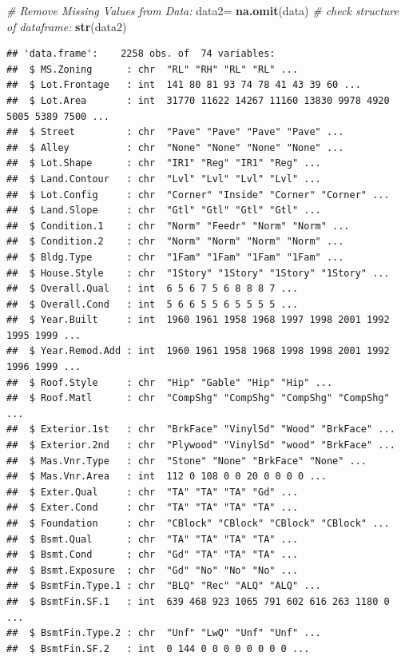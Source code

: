 \documentclass[
]{article}
\newenvironment{Shaded}{\begin{snugshade}}{\end{snugshade}}
\newcommand{\CommentTok}[1]{\textcolor[rgb]{0.56,0.35,0.01}{\textit{#1}}}
\newcommand{\KeywordTok}[1]{\textcolor[rgb]{0.13,0.29,0.53}{\textbf{#1}}}
\newcommand{\NormalTok}[1]{#1}
\newcommand{\StringTok}[1]{\textcolor[rgb]{0.31,0.60,0.02}{#1}}
\begin{document}
\begin{Shaded}
\begin{Highlighting}[]
\CommentTok{# Remove Missing Values from Data:}
\NormalTok{data2=}\StringTok{ }\KeywordTok{na.omit}\NormalTok{(data)}
\CommentTok{# check structure of dataframe:}
\KeywordTok{str}\NormalTok{(data2)}
\end{Highlighting}
\end{Shaded}

\begin{verbatim}
## 'data.frame':    2258 obs. of  74 variables:
##  $ MS.Zoning      : chr  "RL" "RH" "RL" "RL" ...
##  $ Lot.Frontage   : int  141 80 81 93 74 78 41 43 39 60 ...
##  $ Lot.Area       : int  31770 11622 14267 11160 13830 9978 4920 5005 5389 7500 ...
##  $ Street         : chr  "Pave" "Pave" "Pave" "Pave" ...
##  $ Alley          : chr  "None" "None" "None" "None" ...
##  $ Lot.Shape      : chr  "IR1" "Reg" "IR1" "Reg" ...
##  $ Land.Contour   : chr  "Lvl" "Lvl" "Lvl" "Lvl" ...
##  $ Lot.Config     : chr  "Corner" "Inside" "Corner" "Corner" ...
##  $ Land.Slope     : chr  "Gtl" "Gtl" "Gtl" "Gtl" ...
##  $ Condition.1    : chr  "Norm" "Feedr" "Norm" "Norm" ...
##  $ Condition.2    : chr  "Norm" "Norm" "Norm" "Norm" ...
##  $ Bldg.Type      : chr  "1Fam" "1Fam" "1Fam" "1Fam" ...
##  $ House.Style    : chr  "1Story" "1Story" "1Story" "1Story" ...
##  $ Overall.Qual   : int  6 5 6 7 5 6 8 8 8 7 ...
##  $ Overall.Cond   : int  5 6 6 5 5 6 5 5 5 5 ...
##  $ Year.Built     : int  1960 1961 1958 1968 1997 1998 2001 1992 1995 1999 ...
##  $ Year.Remod.Add : int  1960 1961 1958 1968 1998 1998 2001 1992 1996 1999 ...
##  $ Roof.Style     : chr  "Hip" "Gable" "Hip" "Hip" ...
##  $ Roof.Matl      : chr  "CompShg" "CompShg" "CompShg" "CompShg" ...
##  $ Exterior.1st   : chr  "BrkFace" "VinylSd" "Wood" "BrkFace" ...
##  $ Exterior.2nd   : chr  "Plywood" "VinylSd" "wood" "BrkFace" ...
##  $ Mas.Vnr.Type   : chr  "Stone" "None" "BrkFace" "None" ...
##  $ Mas.Vnr.Area   : int  112 0 108 0 0 20 0 0 0 0 ...
##  $ Exter.Qual     : chr  "TA" "TA" "TA" "Gd" ...
##  $ Exter.Cond     : chr  "TA" "TA" "TA" "TA" ...
##  $ Foundation     : chr  "CBlock" "CBlock" "CBlock" "CBlock" ...
##  $ Bsmt.Qual      : chr  "TA" "TA" "TA" "TA" ...
##  $ Bsmt.Cond      : chr  "Gd" "TA" "TA" "TA" ...
##  $ Bsmt.Exposure  : chr  "Gd" "No" "No" "No" ...
##  $ BsmtFin.Type.1 : chr  "BLQ" "Rec" "ALQ" "ALQ" ...
##  $ BsmtFin.SF.1   : int  639 468 923 1065 791 602 616 263 1180 0 ...
##  $ BsmtFin.Type.2 : chr  "Unf" "LwQ" "Unf" "Unf" ...
##  $ BsmtFin.SF.2   : int  0 144 0 0 0 0 0 0 0 0 ...

\end{verbatim}
\end{document}
